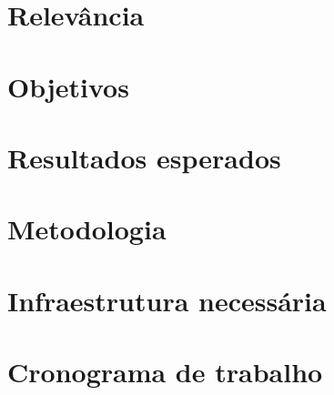\documentclass[brazil, a4paper,12pt]{article}
\begin{document}
\section{Relevância}
\section{Objetivos}
\section{Resultados esperados}
\section{Metodologia}
\section{Infraestrutura necessária}
\section{Cronograma de trabalho}

\cite{Kale:2010} \\
\cite{Manferdelli:2008} \\
\cite{Dean:2008} \\
\cite{Asanovic:2009}


\end{document}
